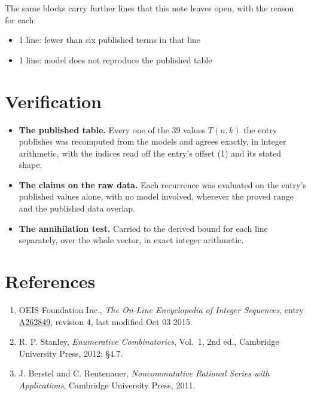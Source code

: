 \documentclass[11pt]{article}
\theoremstyle{definition}
\begin{document}
The same blocks carry further lines that this note leaves open, with the reason for each:

\begin{itemize}

\item 1 line: fewer than six published terms in that line

\item 1 line: model does not reproduce the published table

\end{itemize}

\section{Verification}

\begin{itemize}

\item {\bfseries The published table.} Every one of the 39 values $T(n,k)$ the entry publishes was recomputed from the models and agrees exactly, in integer arithmetic, with the indices read off the entry's offset (1) and its stated shape.

\item {\bfseries The claims on the raw data.} Each recurrence was evaluated on the entry's published values alone, with no model involved, wherever the proved range and the published data overlap.

\item {\bfseries The annihilation test.} Carried to the derived bound for each line separately, over the whole vector, in exact integer arithmetic.

\end{itemize}

\section{References}

\begin{enumerate}

\item OEIS Foundation Inc., \emph{The On-Line Encyclopedia of Integer Sequences}, entry \href{https://oeis.org/A262849}{A262849}, revision 4, last modified Oct 03 2015.

\item R. P. Stanley, \emph{Enumerative Combinatorics}, Vol.~1, 2nd ed., Cambridge University Press, 2012; \S4.7.

\item J. Berstel and C. Reutenauer, \emph{Noncommutative Rational Series with Applications}, Cambridge University Press, 2011.

\end{enumerate}
\end{document}

